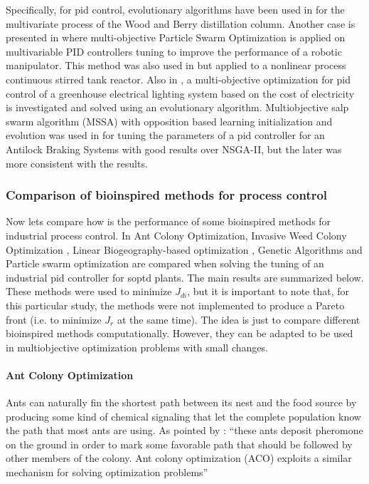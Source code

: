 Specifically, for \gls{pid} control, evolutionary algorithms have been used in \citet{Reynoso-Meza2012b} for the multivariate process of the Wood and Berry distillation column. Another case is presented in \citet{Pierezan2014} where multi-objective Particle Swarm Optimization is applied on multivariable PID controllers tuning to improve the performance of a robotic manipulator. This method was also used in \citet{Tian2014} but applied to a nonlinear process continuous stirred tank reactor. Also in \citet{Mahdavian2014}, a multi-objective optimization for \gls{pid} control of a greenhouse electrical lighting system based on the cost of electricity is investigated and solved using an evolutionary algorithm. Multiobjective salp swarm algorithm (MSSA) with opposition based learning initialization and evolution was used in \citet{Domingues2019} for tuning the parameters of a \gls{pid} controller for an Antilock Braking Systems with good results over NSGA-II, but the later was more consistent with the results.

\subsubsection{Comparison of bioinspired methods for process control}
%
Now lets compare how is the performance of some bioinspired methods for industrial process control. In \citet{Cespedes2016} Ant Colony Optimization, Invasive Weed Colony Optimization \citep{Mehrabian2006}, Linear Biogeography-based optimization \citep{Simon2008}, Genetic Algorithms and Particle swarm optimization are compared when solving the tuning of an industrial \gls{pid} controller for \gls{soptd} plants. The main results are summarized below. These methods were used to minimize $J_{di}$, but it is important to note that, for this particular study, the methods were not implemented to produce a Pareto front (i.e. to minimize $J_r$ at the same time). The idea is just to compare different bioinspired methods computationally. However, they can be adapted to be used in multiobjective optimization problems with small changes.

\paragraph{Ant Colony Optimization}
\label{sec:ACO}
Ants can naturally fin the shortest path between its nest and the food source by producing some kind of chemical signaling that let the complete population know the path that most ants are using.  As pointed by \citet{Dorigo2006}: ``these  ants  deposit pheromone  on  the  ground  in  order  to  mark  some  favorable path that should be followed by other members of the colony. Ant colony optimization (ACO) exploits a similar mechanism for solving optimization problems''

